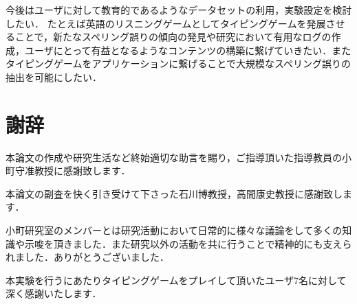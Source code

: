 \begin{comment}
タイピングゲームにおいて1文字入力するときの入力時間を記録しておくことでユーザがスペリング誤りを起こしていることを気付いて文字を打ち止めるときの文字と文字の間の境界をわかるようにするようにしたり，Babaらの研究\cite{babaACL2012}のようにバックスペースの入力をさせるようにしてスペリング誤りが修正されるものかそうでないかを明確にする必要があると考えられる．
\end{comment}

\begin{comment}
有用なログを抽出するために英単語以外にも英語の文章や日本語の単語，文章に対応するようなゲームの設計を行いたい．
\end{comment}

今後はユーザに対して教育的であるようなデータセットの利用，実験設定を検討したい．
たとえば英語のリスニングゲームとしてタイピングゲームを発展させることで，新たなスペリング誤りの傾向の発見や研究において有用なログの作成，ユーザにとって有益となるようなコンテンツの構築に繋げていきたい．またタイピングゲームをアプリケーションに繋げることで大規模なスペリング誤りの抽出を可能にしたい．

\newpage

\section*{\Large 謝辞}
本論文の作成や研究生活など終始適切な助言を賜り，ご指導頂いた指導教員の小町守准教授に感謝致します．

本論文の副査を快く引き受けて下さった石川博教授，高間康史教授に感謝致します．

小町研究室のメンバーとは研究活動において日常的に様々な議論をして多くの知識や示唆を頂きました．また研究以外の活動を共に行うことで精神的にも支えられました．ありがとうございました．

本実験を行うにあたりタイピングゲームをプレイして頂いたユーザ7名に対して深く感謝いたします．

